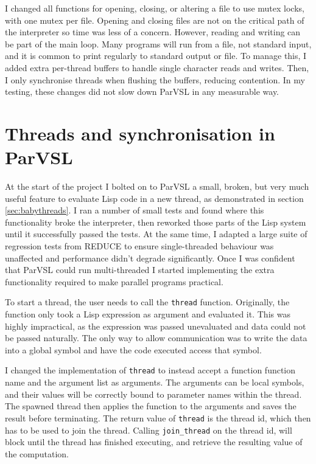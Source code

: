 I changed all functions for opening, closing, or altering a file to use mutex locks, with one mutex per file.
Opening and closing files are not on the critical path of the interpreter so time was less of a concern.
However, reading and writing can be part of the main loop. Many programs will run from a file, not standard input,
and it is common to print regularly to standard output or file. To manage this, I added extra per-thread buffers
to handle single character reads and writes. Then, I only synchronise threads when flushing the buffers, reducing
contention. In my testing, these changes did not slow down ParVSL in any measurable way.

\section{Threads and synchronisation in ParVSL}
\label{sec:threads}

At the start of the project I bolted on to ParVSL a small, broken, but very much useful feature to evaluate
Lisp code in a new thread, as demonstrated in section \ref{sec:babythreads}. I ran a number of small tests
and found where this functionality broke the interpreter, then reworked those parts of the Lisp system
until it successfully passed the tests. At the same time, I adapted a large suite of regression tests
from REDUCE to ensure single-threaded behaviour was unaffected and performance didn't degrade significantly.
Once I was confident that ParVSL could run multi-threaded I started implementing the extra functionality
required to make parallel programs practical.

To start a thread, the user needs to call the \verb|thread| function.
Originally, the function only took a Lisp expression as argument and evaluated it. This was highly impractical,
as the expression was passed unevaluated and data could not be passed naturally. The only way to allow
communication was to write the data into a global symbol and have the code executed access that symbol.

I changed the implementation of \verb|thread| to instead accept a function function name and the argument list
as arguments. The arguments can be local symbols, and their values will be correctly bound to parameter names
within the thread. The spawned thread then applies the function to the arguments and saves the result
before terminating. The return value of \verb|thread| is the thread id, which then has to be used to
join the thread. Calling  \verb|join_thread| on the thread id, will block until the thread has finished
executing, and retrieve the resulting value of the computation.

